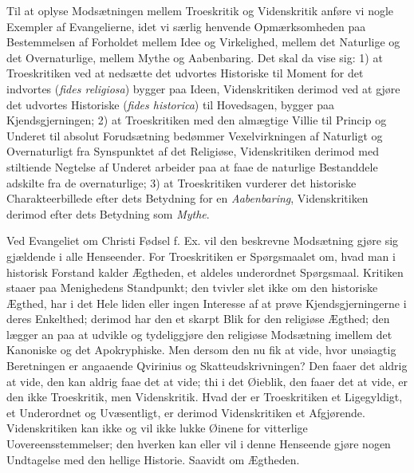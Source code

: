 \documentclass[12pt]{book}
\newcommand{\opage}[1]{\marginnote{\footnotesize\textit{[#1]}}}
\begin{document}
Til at oplyse Modsætningen mellem Troeskritik og
Videnskritik anføre vi nogle Exempler af Evangelierne, idet
vi særlig henvende Opmærksomheden paa Bestemmelsen af
Forholdet mellem Idee og Virkelighed, mellem det Naturlige
\opage{59}\setcounter{footnote}{0}%
og det Overnaturlige, mellem Mythe og Aabenbaring. Det
skal da vise sig: 1) at Troeskritiken ved at nedsætte det
udvortes Historiske til Moment for det indvortes (\textit{fides
religiosa}) bygger paa Ideen, Videnskritiken derimod ved
at gjøre det udvortes Historiske (\textit{fides historica}) til Hovedsagen,
bygger paa Kjendsgjerningen; 2) at Troeskritiken
med den almægtige Villie til Princip og Underet til absolut
Forudsætning bedømmer Vexelvirkningen af Naturligt
og Overnaturligt fra Synspunktet af det Religiøse,
Videnskritiken derimod med stiltiende Negtelse af Underet
arbeider paa at faae de naturlige Bestanddele adskilte fra de
overnaturlige; 3) at Troeskritiken vurderer det historiske
Charakteerbillede efter dets Betydning for en \emph{Aabenbaring},
Videnskritiken derimod efter dets Betydning som \emph{Mythe}.

Ved Evangeliet om Christi Fødsel f. Ex. vil den beskrevne
Modsætning gjøre sig gjældende i alle Henseender.
For Troeskritiken er Spørgsmaalet om, hvad man i historisk
Forstand kalder Ægtheden, et aldeles underordnet Spørgsmaal.
Kritiken staaer paa Menighedens Standpunkt; den
tvivler slet ikke om den historiske Ægthed, har i det Hele
liden eller ingen Interesse af at prøve Kjendsgjerningerne i
deres Enkelthed; derimod har den et skarpt Blik for den religiøse
Ægthed; den lægger an paa at udvikle og tydeliggjøre
den religiøse Modsætning imellem det Kanoniske og det Apokryphiske.
Men dersom den nu fik at vide, hvor unøiagtig
Beretningen er angaaende Qvirinius og Skatteudskrivningen?
Den faaer det aldrig at vide, den kan aldrig faae det at
vide; thi i det Øieblik, den faaer det at vide, er den ikke
Troeskritik, men Videnskritik. Hvad der er Troeskritiken et
Ligegyldigt, et Underordnet og Uvæsentligt, er derimod Videnskritiken
et Afgjørende. Videnskritiken kan ikke og vil ikke
lukke Øinene for vitterlige Uovereensstemmelser; den hverken
kan eller vil i denne Henseende gjøre nogen Undtagelse med
den hellige Historie. Saavidt om Ægtheden.
\end{document}
